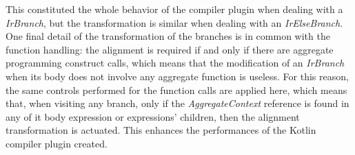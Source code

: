 This constituted the whole behavior of the compiler plugin when dealing with a \textit{IrBranch}, but the transformation is similar when dealing with an \textit{IrElseBranch}.\newline
One final detail of the transformation of the branches is in common with the function handling: the alignment is required if and only if there are aggregate programming construct calls, which means that the modification of an \textit{IrBranch} when its body does not involve any aggregate function is useless.\newline
For this reason, the same controls performed for the function calls are applied here, which means that, when visiting any branch, only if the \textit{AggregateContext} reference is found in any of it body expression or expressions' children, then the alignment transformation is actuated. This enhances the performances of the Kotlin compiler plugin created.
